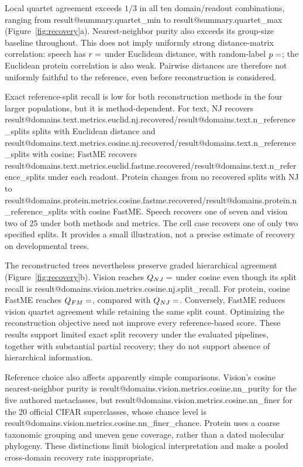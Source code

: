 \documentclass[mlmain]{jmlr}
\makeatletter
\newcommand{\Result}[1]{\csname result@#1\endcsname}
\makeatother
\begin{document}
Local quartet agreement exceeds $1/3$ in all ten domain/readout combinations, ranging from
\Result{summary.quartet_min} to \Result{summary.quartet_max} (Figure~\ref{fig:recovery}a).
Nearest-neighbor purity also exceeds its group-size baseline throughout. This does not imply
uniformly strong distance-matrix correlation: speech has $r=\Result{domains.speech.metrics.euclid.distance_r}$
under Euclidean distance, with random-label $p=\Result{domains.speech.metrics.euclid.permutation.distance_r_p}$;
the Euclidean protein correlation is also weak. Pairwise distances are therefore not uniformly
faithful to the reference, even before reconstruction is considered.

Exact reference-split recall is low for both reconstruction methods in the four larger populations,
but it is method-dependent. For text, NJ recovers
\Result{domains.text.metrics.euclid.nj.recovered}/\Result{domains.text.n_reference_splits} splits with
Euclidean distance and \Result{domains.text.metrics.cosine.nj.recovered}/\Result{domains.text.n_reference_splits}
with cosine; FastME recovers \Result{domains.text.metrics.euclid.fastme.recovered}/\Result{domains.text.n_reference_splits}
under each readout. Protein changes from no recovered splits with NJ to
\Result{domains.protein.metrics.cosine.fastme.recovered}/\Result{domains.protein.n_reference_splits}
with cosine FastME. Speech recovers one of seven and vision two of 25 under both methods and metrics.
The cell case recovers one of only two specified splits. It provides a small illustration, not a
precise estimate of recovery on developmental trees.

The reconstructed trees nevertheless preserve graded hierarchical agreement
(Figure~\ref{fig:recovery}b). Vision reaches
$Q_{NJ}=\Result{domains.vision.metrics.cosine.nj.tree_quartet}$ under cosine even though its split
recall is \Result{domains.vision.metrics.cosine.nj.split_recall}.
For protein, cosine FastME reaches $Q_{FM}=\Result{domains.protein.metrics.cosine.fastme.tree_quartet}$,
compared with $Q_{NJ}=\Result{domains.protein.metrics.cosine.nj.tree_quartet}$.
Conversely, FastME reduces vision quartet agreement while retaining the same split count.
Optimizing the reconstruction objective need not improve every reference-based score. These
results support limited exact split recovery under the evaluated pipelines, together with
substantial partial recovery; they do not support absence of hierarchical information.

Reference choice also affects apparently simple comparisons. Vision's cosine nearest-neighbor
purity is \Result{domains.vision.metrics.cosine.nn_purity} for the five authored metaclasses, but
\Result{domains.vision.metrics.cosine.nn_finer} for the 20 official CIFAR superclasses, whose chance
level is \Result{domains.vision.metrics.cosine.nn_finer_chance}. Protein uses a coarse taxonomic
grouping and uneven gene coverage, rather than a dated molecular phylogeny. These distinctions
limit biological interpretation and make a pooled cross-domain recovery rate inappropriate.
\end{document}
